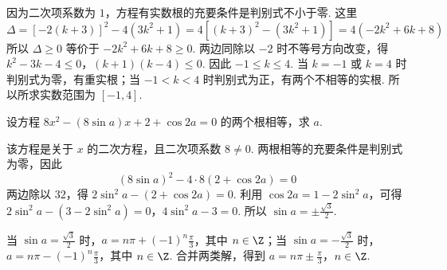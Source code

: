 \begin{solution}
因为二次项系数为 \(1\)，方程有实数根的充要条件是判别式不小于零. 这里
\[
\Delta=\left[-2\left(k+3\right)\right]^2-4\left(3k^2+1\right)
=4\left[\left(k+3\right)^2-\left(3k^2+1\right)\right]
=4\left(-2k^2+6k+8\right)
\]
所以 \(\Delta\geq0\) 等价于 \(-2k^2+6k+8\geq0\). 两边同除以 \(-2\) 时不等号方向改变，得
\(k^2-3k-4\leq0\)，\(\left(k+1\right)\left(k-4\right)\leq0\).
因此 \(-1\leq k\leq4\). 当 \(k=-1\) 或 \(k=4\) 时判别式为零，有重实根；当 \(-1<k<4\) 时判别式为正，有两个不相等的实根. 所以所求实数范围为 \(\left[-1,4\right]\).
\end{solution}

\begin{problem}
设方程 \(8x^2-\left(8\sin a\right)x+2+\cos2a=0\) 的两个根相等，求 \(a\).
\end{problem}

\begin{solution}
该方程是关于 \(x\) 的二次方程，且二次项系数 \(8\neq0\). 两根相等的充要条件是判别式为零，因此
\[
\left(8\sin a\right)^2-4\cdot8\left(2+\cos2a\right)=0
\]
两边除以 \(32\)，得 \(2\sin^2a-\left(2+\cos2a\right)=0\). 利用 \(\cos2a=1-2\sin^2a\)，可得
\(2\sin^2a-\left(3-2\sin^2a\right)=0\)，\(4\sin^2a-3=0\).
所以 \(\sin a=\pm\frac{\sqrt3}{2}\).

当 \(\sin a=\frac{\sqrt3}{2}\) 时，\(a=n\pi+\left(-1\right)^n\frac{\pi}{3}\)，其中 \(n\in\Z\)；当 \(\sin a=-\frac{\sqrt3}{2}\) 时，\(a=n\pi-\left(-1\right)^n\frac{\pi}{3}\)，其中 \(n\in\Z\). 合并两类解，得到
\(a=n\pi\pm\frac{\pi}{3}\)，\(n\in\Z\).
\end{solution}
